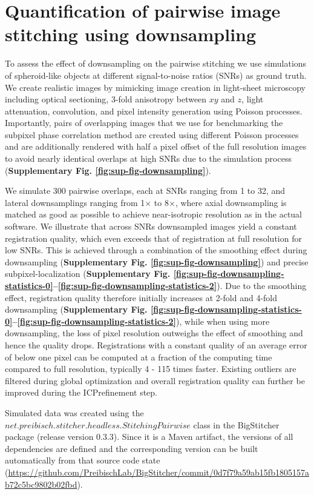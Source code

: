\section{Quantification of pairwise image stitching using downsampling}
\label{sec:quantPCM}

To assess the effect of downsampling on the pairwise stitching we use simulations of spheroid-like objects at different signal-to-noise ratios (SNRs) as ground truth. We create realistic images by mimicking image creation in light-sheet microscopy including optical sectioning, 3-fold anisotropy between $xy$ and $z$, light attenuation, convolution, and pixel intensity generation using Poisson processes\cite{mvdecon}. Importantly, pairs of overlapping images that we use for benchmarking the subpixel phase correlation method are created using different Poisson processes and are additionally rendered with half a pixel offset of the full resolution images to avoid nearly identical overlaps at high SNRs due to the simulation process (\textbf{Supplementary Fig. \ref{fig:sup-fig-downsampling}}).

We simulate 300 pairwise overlaps, each at SNRs ranging from 1 to 32, and lateral downsamplings ranging from 1$\times$ to 8$\times$, where axial downsampling is matched as good as possible to achieve near-isotropic resolution as in the actual software. We illustrate that across SNRs downsampled images yield a constant registration quality, which even exceeds that of registration at full resolution for low SNRs. This is achieved through a combination of the smoothing effect during downsampling (\textbf{Supplementary Fig. \ref{fig:sup-fig-downsampling}}) and precise subpixel-localization (\textbf{Supplementary Fig. \ref{fig:sup-fig-downsampling-statistics-0}--\ref{fig:sup-fig-downsampling-statistics-2}}). Due to the smoothing effect, registration quality therefore initially increases at 2-fold and 4-fold downsampling (\textbf{Supplementary Fig. \ref{fig:sup-fig-downsampling-statistics-0}--\ref{fig:sup-fig-downsampling-statistics-2}}), while when using more downsampling, the loss of pixel resolution outweighs the effect of smoothing and hence the quality drops. Registrations with a constant quality of an average error of below one pixel can be computed at a fraction of the computing time compared to full resolution, typically 4 - 115 times faster. Existing outliers are filtered during global optimization and overall registration quality can further be improved during the ICP\cite{icp }refinement step.

Simulated data was created using the $net.preibisch.stitcher.headless.StitchingPairwise$ class in the BigStitcher package (release version 0.3.3). Since it is a Maven artifact, the versions of all dependencies are defined and the corresponding version can be built automatically from that source code state \small(\url{https://github.com/PreibischLab/BigStitcher/commit/0d7f79a59ab15fb1805157ab72c5bc9802b02fbd}).


